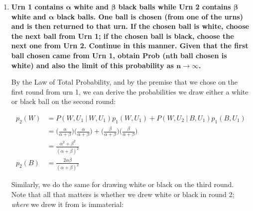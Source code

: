 \documentclass[10pt, oneside]{article}
\begin{document}
\begin{enumerate}[label=3.\arabic*]
\begin{proof}
Establishing the desired result. The limit as $n \rightarrow + \infty$ is

\[ \lim_{n \rightarrow +\infty} p_n = \lim_{n \rightarrow +\infty} \bigg( \frac{\alpha}{\alpha + \beta} + \frac{\beta}{(\alpha + \beta)(\alpha + \beta + 1)^n} \bigg) = \boxed{\frac{\alpha}{\alpha + \beta}} \]

which is ordinarily $p_1$ without the premise that we are guaranteed to draw white on the first round from Urn 1. This means for big $n$ urns, the odds of picking white from the $n$-th urn are just as good as picking from the first urn.

\end{proof}

\item  \begin{tcolorbox}[
  colback=Cerulean!5!white,
  colframe=Cerulean!75!black]
\textbf{Urn 1 contains $\bm{\alpha}$ white and $\bm{\beta}$ black balls while Urn 2 contains $\bm{\beta}$ white and $\bm{\alpha}$ black balls. One ball is chosen (from one of the urns) and is then returned to that urn. If the chosen ball is white, choose the next ball from Urn 1; if the chosen ball is black, choose the next one from Urn 2. Continue in this manner. Given that the first ball chosen came from Urn 1, obtain Prob ($\bm{n}$th ball chosen is white) and also the limit of this probability as $\bm{n \rightarrow \infty}$.}
\end{tcolorbox}

By the Law of Total Probability, and by the premise that we chose on the first round from urn 1, we can derive the probabilities we draw either a white or black ball on the second round:

\begin{align*}
p_2 (W) &= P(W, U_1 \ | \ W, U_1) p_1 (W, U_1) + P(W, U_2 \ | \ B, U_1) p_1 (B, U_1) \\
&= \bigg( \frac{\alpha}{\alpha + \beta} \bigg) \bigg( \frac{\alpha}{\alpha + \beta} \bigg) + \bigg( \frac{\beta}{\alpha + \beta} \bigg) \bigg( \frac{\beta}{\alpha + \beta} \bigg) \\
&= \boxed{ \frac{\alpha^2 + \beta^2}{(\alpha + \beta)^2} } \\
p_2 (B) &= \boxed{ \frac{2\alpha \beta}{(\alpha + \beta)^2} }
\end{align*}

Similarly, we do the same for drawing white or black on the third round. Note that all that matters is whether we drew white or black in round 2; \textit{where} we drew it from is immaterial:


\end{enumerate}
\end{document}
